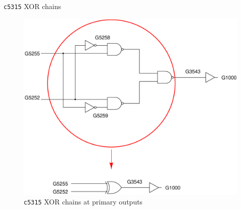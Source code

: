 \begin{frame}{\texttt{c5315} XOR chains}
       \begin{figure}
                \begin{center}
                \label{fig:c5315-c-l}
                \caption{\texttt{c5315} XOR chains at primary outputs}
                        \includegraphics[scale=0.2]{fig/c5315-xor-chains.pdf}
                \end{center}
        \end{figure}

\end{frame}
